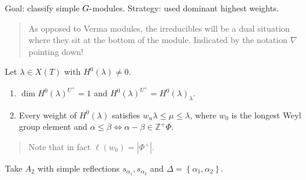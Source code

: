 \begin{center}
\end{center}

Goal: classify simple \(G{\hbox{-}}\)modules. Strategy: used dominant
highest weights.

\begin{quote}
As opposed to Verma modules, the irreducibles will be a dual situation
where they sit at the bottom of the module. Indicated by the notation
\(\nabla\) pointing down!
\end{quote}

\begin{proposition}[?]

Let \(\lambda \in X(T)\) with \(H^0(\lambda) \neq 0\).

\begin{enumerate}
\def\labelenumi{\arabic{enumi}.}
\tightlist
\item
  \(\dim H^0(\lambda)^{U^+} = 1\) and
  \(H^0(\lambda)^{U^+} = H^0(\lambda)_\lambda\).
\item
  Every weight of \(H^0(\lambda)\) satisfies
  \(w_u \lambda \leq \mu \leq \lambda\), where \(w_0\) is the longest
  Weyl group element and
  \(\alpha\leq \beta \iff \alpha-\beta \in {\mathbb{Z}}^{+}\Phi\).
\end{enumerate}

\begin{quote}
Note that in fact \(\ell(w_0) = {\left\lvert {\Phi^+} \right\rvert}\).
\end{quote}

\end{proposition}

\begin{example}

Take \(A_2\) with simple reflections \(s_{\alpha_1}, s_{\alpha_2}\) and
\(\Delta = \left\{{\alpha_1, \alpha_2}\right\}\).

\begin{center}
\end{center}

\end{example}

